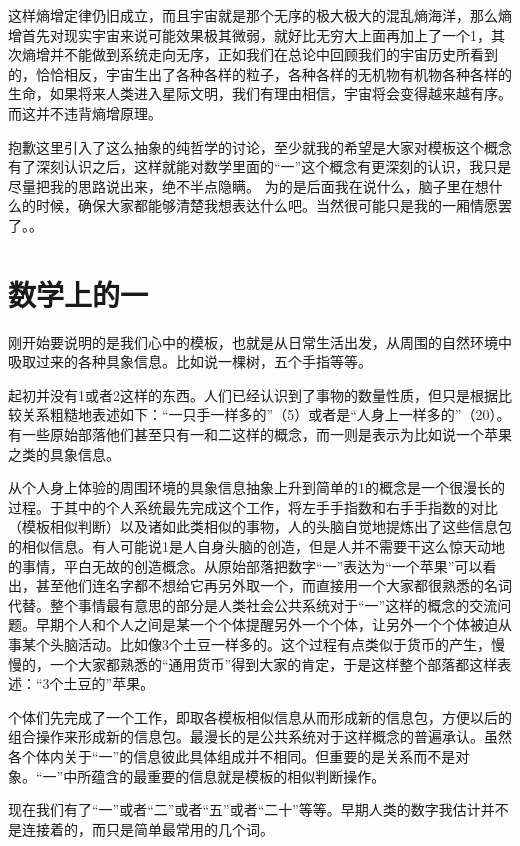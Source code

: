 \documentclass[12pt]{exam}%
\begin{document}
这样熵增定律仍旧成立，而且宇宙就是那个无序的极大极大的混乱熵海洋，那么熵增首先对现实宇宙来说可能效果极其微弱，就好比无穷大上面再加上了一个1，其次熵增并不能做到系统走向无序，正如我们在总论中回顾我们的宇宙历史所看到的，恰恰相反，宇宙生出了各种各样的粒子，各种各样的无机物有机物各种各样的生命，如果将来人类进入星际文明，我们有理由相信，宇宙将会变得越来越有序。而这并不违背熵增原理。

抱歉这里引入了这么抽象的纯哲学的讨论，至少就我的希望是大家对模板这个概念有了深刻认识之后，这样就能对数学里面的“一”这个概念有更深刻的认识，我只是尽量把我的思路说出来，绝不半点隐瞒。 为的是后面我在说什么，脑子里在想什么的时候，确保大家都能够清楚我想表达什么吧。当然很可能只是我的一厢情愿罢了。。



\section{数学上的一}
刚开始要说明的是我们心中的模板，也就是从日常生活出发，从周围的自然环境中吸取过来的各种具象信息。比如说一棵树，五个手指等等。

起初并没有1或者2这样的东西。人们已经认识到了事物的数量性质，但只是根据比较关系粗糙地表述如下：“一只手一样多的”（5）或者是“人身上一样多的”（20）。有一些原始部落他们甚至只有一和二这样的概念，而一则是表示为比如说一个苹果之类的具象信息。

从个人身上体验的周围环境的具象信息抽象上升到简单的1的概念是一个很漫长的过程。于其中的个人系统最先完成这个工作，将左手手指数和右手手指数的对比（模板相似判断）以及诸如此类相似的事物，人的头脑自觉地提炼出了这些信息包的相似信息。有人可能说1是人自身头脑的创造，但是人并不需要干这么惊天动地的事情，平白无故的创造概念。从原始部落把数字“一”表达为“一个苹果”可以看出，甚至他们连名字都不想给它再另外取一个，而直接用一个大家都很熟悉的名词代替。整个事情最有意思的部分是人类社会公共系统对于“一”这样的概念的交流问题。早期个人和个人之间是某一个个体提醒另外一个个体，让另外一个个体被迫从事某个头脑活动。比如像3个土豆一样多的。这个过程有点类似于货币的产生，慢慢的，一个大家都熟悉的“通用货币”得到大家的肯定，于是这样整个部落都这样表述：“3个土豆的”苹果。

个体们先完成了一个工作，即取各模板相似信息从而形成新的信息包，方便以后的组合操作来形成新的信息包。最漫长的是公共系统对于这样概念的普遍承认。虽然各个体内关于“一”的信息彼此具体组成并不相同。但重要的是关系而不是对象。“一”中所蕴含的最重要的信息就是模板的相似判断操作。

现在我们有了“一”或者“二”或者“五”或者“二十”等等。早期人类的数字我估计并不是连接着的，而只是简单最常用的几个词。
\end{document}
